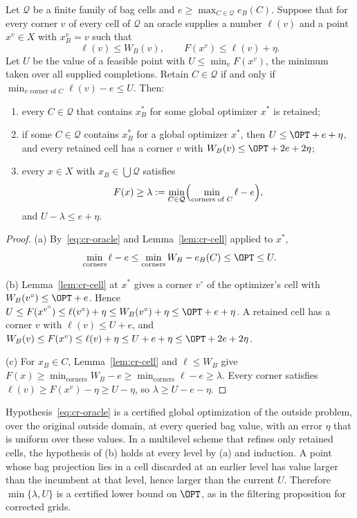 \begin{theorem}\label{thm:cr-filter}
Let $\mathcal Q$ be a finite family of bag cells and
$e\ge\max_{C\in\mathcal Q}e_B(C)$. Suppose that for every corner $v$ of
every cell of $\mathcal Q$ an oracle supplies a number $\ell(v)$ and a
point $x^v\in X$ with $x^v_B=v$ such that
\begin{equation}\label{eq:cr-oracle}
\ell(v)\le W_B(v),\qquad F(x^v)\le\ell(v)+\eta .
\end{equation}
Let $U$ be the value of a feasible point with $U\le\min_vF(x^v)$, the
minimum taken over all supplied completions. Retain $C\in\mathcal Q$ if
and only if $\min_{v\text{ corner of }C}\ell(v)-e\le U$. Then:
\begin{enumerate}
\item[(a)] every $C\in\mathcal Q$ that contains $x^*_B$ for some global
optimizer $x^*$ is retained;
\item[(b)] if some $C\in\mathcal Q$ contains $x^*_B$ for a global optimizer
$x^*$, then $U\le\OPT+e+\eta$, and every retained cell has a corner $v$
with $W_B(v)\le\OPT+2e+2\eta$;
\item[(c)] every $x\in X$ with $x_B\in\bigcup\mathcal Q$ satisfies
\[
F(x)\ge\lambda:=\min_{C\in\mathcal Q}\Bigl(\min_{\text{corners of }C}\ell-e\Bigr),
\]
and $U-\lambda\le e+\eta$.
\end{enumerate}
\end{theorem}
\begin{proof}
(a) By~\eqref{eq:cr-oracle} and Lemma~\ref{lem:cr-cell} applied to $x^*$,
\[
\min_{\text{corners}}\ell-e\le\min_{\text{corners}}W_B-e_B(C)\le\OPT\le U.
\]

(b) Lemma~\ref{lem:cr-cell} at $x^*$ gives a corner $v^\circ$ of the
optimizer's cell with $W_B(v^\circ)\le\OPT+e$. Hence
$U\le F(x^{v^\circ})\le\ell(v^\circ)+\eta\le W_B(v^\circ)+\eta\le\OPT+e+\eta$.
A retained cell has a corner $v$ with $\ell(v)\le U+e$, and
$W_B(v)\le F(x^v)\le\ell(v)+\eta\le U+e+\eta\le\OPT+2e+2\eta$.

(c) For $x_B\in C$, Lemma~\ref{lem:cr-cell} and $\ell\le W_B$ give
$F(x)\ge\min_{\text{corners}}W_B-e\ge\min_{\text{corners}}\ell-e\ge\lambda$.
Every corner satisfies $\ell(v)\ge F(x^v)-\eta\ge U-\eta$, so
$\lambda\ge U-e-\eta$.
\end{proof}

\begin{remark}
Hypothesis~\eqref{eq:cr-oracle} is a certified global optimization of the
outside problem, over the original outside domain, at every queried bag
value, with an error $\eta$ that is uniform over these values. In a
multilevel scheme that refines only retained cells, the hypothesis of
(b) holds at every level by (a) and induction. A point whose bag
projection lies in a cell discarded at an earlier level has value larger
than the incumbent at that level, hence larger than the current $U$.
Therefore $\min\{\lambda,U\}$ is a certified lower bound on $\OPT$, as in
the filtering proposition for corrected grids.
\end{remark}

